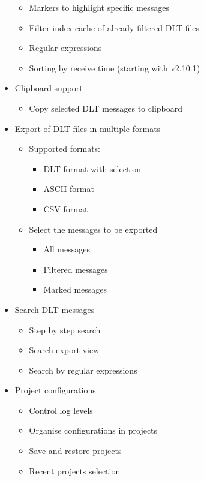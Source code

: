 \documentclass[a4paper,11pt]{article}
\begin{document}
\begin{itemize}
\begin{itemize}
    \item Markers to highlight specific messages
    \item Filter index cache of already filtered DLT files
    \item Regular expressions
    \item Sorting by receive time (starting with v2.10.1)
 \end{itemize}
\item Clipboard support
 \begin{itemize}
    \item Copy selected DLT messages to clipboard
 \end{itemize}
\item Export of DLT files in multiple formats
 \begin{itemize}
    \item Supported formats:
     \begin{itemize}
       \item DLT format with selection
       \item ASCII format
       \item CSV format
     \end{itemize}
 \end{itemize}
\begin{itemize}
    \item Select the messages to be exported
       \begin{itemize}
       \item All messages
       \item Filtered messages
       \item Marked messages
     \end{itemize}
 \end{itemize}
\item Search DLT messages
   \begin{itemize}
    \item Step by step search
    \item Search export view
    \item Search by regular expressions
   \end{itemize}
\item Project configurations
   \begin{itemize}
    \item Control log levels
    \item Organise configurations in projects
    \item Save and restore projects
    \item Recent projects selection

\end{itemize}
\end{itemize}
\end{document}
